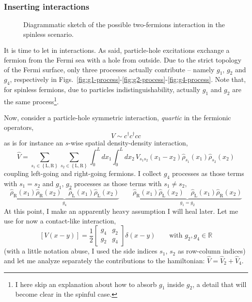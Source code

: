 \subsubsection{Inserting interactions}

\begin{figure}
	\centering
	\subfloat[][$g_1 = V(q \approx \pm 2k_F)$ process.]{
		
		\label{fig:g1-process}
	}
	\subfloat[][$g_2 = V(q \approx 0)$ process.]{
		
		\label{fig:g2-process}
	}
	\subfloat[][$g_4 = V(q \approx 0)$ process.]{
		
		\label{fig:g4-process}
	}
	\caption{Diagrammatic sketch of the possible two-fermions interaction in the spinless scenario.}
	\label{fig:g-processes}
\end{figure}

It is time to let in interactions. As said, particle-hole excitations exchange a fermion from the Fermi sea with a hole from outside. Due to the strict topology of the Fermi surface, only three processes actually contribute -- namely $g_1$, $g_2$ and $g_4$, respectively in Figs.~\ref{fig:g1-process}-\ref{fig:g2-process}-\ref{fig:g4-process}. Note that, for spinless fermions, due to particles indistinguishability, actually $g_1$ and $g_2$ are the same process\footnote{
	I here skip an explanation about how to absorb $g_1$ inside $g_2$, a detail that will become clear in the spinful case.
}.

Now, consider a particle-hole symmetric interaction, \textit{quartic} in the fermionic operators,
\[
	V \sim c^\dagger c^\dagger c c
\]
as is for instance an $s$-wise spatial density-density interaction,
\[
	\hat V = \sum_{s_1 \in \left\{\mathrm L, \mathrm R\right\}} \sum_{s_2 \in \left\{\mathrm L, \mathrm R\right\}} \int_0^L dx_1 \int_0^L dx_2 \, V_{s_1 s_2}(x_1-x_2) \hat \rho_{s_1}(x_1) \hat \rho_{s_2} (x_2)
\]
coupling left-going and right-going fermions. I collect $g_4$ processes as those terms with $s_1 = s_2$ and $g_1$, $g_2$ processes as those terms with $s_1 \neq s_2$,
\[
	\underbrace{\hat \rho_\mathrm{R} (x_1) \hat \rho_\mathrm{R} (x_2) \quad \hat \rho_\mathrm{L} (x_1) \hat \rho_\mathrm{L} (x_2)}_{g_4} \qquad \underbrace{\hat \rho_\mathrm{R} (x_1) \hat \rho_\mathrm{L} (x_2) \quad \hat \rho_\mathrm{L} (x_1) \hat \rho_\mathrm{R} (x_2)}_{g_1 = g_2}
\]
At this point, I make an apparently heavy assumption I will heal later. Let me use for now a contact-like interaction,
\[
	\left[V(x-y)\right] = \frac{1}{2} \begin{bmatrix}
		g_4 & g_2 \\ g_2 & g_4
	\end{bmatrix} \delta(x-y)
	\qquad
	\text{with $g_2, g_4 \in \mathbb{R}$}
\]
(with a little notation abuse, I used the side indices $s_1$, $s_2$ as row-column indices) and let me analyze separately the contributions to the hamiltonian: $\hat V = \hat V_2 + \hat V_4$.

